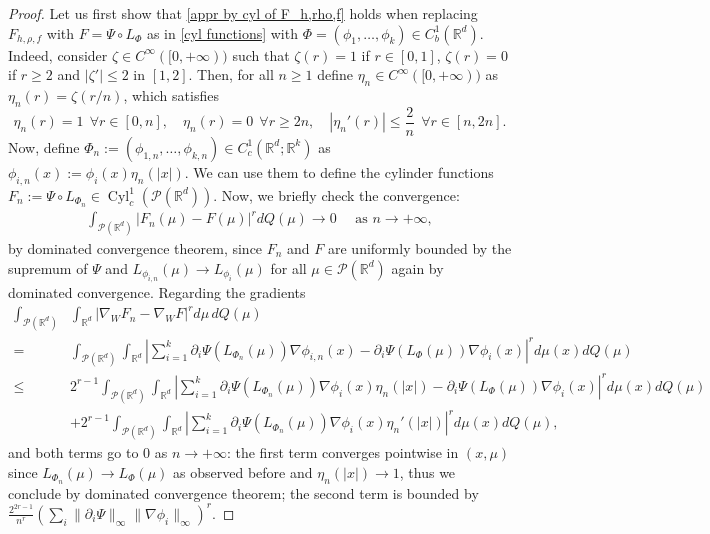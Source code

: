 \documentclass[10pt,leqno]{amsart}
\numberwithin{equation}{section}
\newcommand{\R}{\mathbb{R}}
\newcommand{\PP}{\mathcal{P}}
\begin{document}
\begin{proof}
	Let us first show that \eqref{appr by cyl of F_h,rho,f} holds when replacing $F_{h,\rho,f}$ with $F = \Psi \circ L_{\Phi}$ as in \eqref{cyl functions} with $\Phi = (\phi_1,\dots,\phi_k) \in C_b^1(\R^d)$. Indeed, consider $\zeta\in C^\infty([0,+\infty))$ such that $\zeta(r) = 1$ if $r\in[0,1]$, $\zeta(r) =0$ if $r\geq 2$ and $|\zeta'|\leq 2$ in $[1,2]$. Then, for all $n\geq 1$ define $\eta_n\in C^\infty([0,+\infty))$ as $\eta_n(r) = \zeta(r/n)$, which satisfies
	\[\eta_n(r)= 1\ \ \forall r\in[0,n], \quad \eta_n(r) = 0\ \ \forall r\geq 2n, \quad |\eta_n'(r)|\leq \frac{2}{n} \ \ \forall r\in[n,2n].\]
	Now, define $\Phi_n:= (\phi_{1,n}, \dots, \phi_{k,n}) \in C_c^1(\R^d;\R^k)$ as $\phi_{i,n}(x) := \phi_i(x) \eta_n(|x|)$. We can use them to define the cylinder functions $F_n := \Psi \circ L_{\Phi_n}\in\operatorname{Cyl}_c^1(\PP(\R^d))$. Now, we briefly check the convergence:
	\begin{align*}
		\int_{\PP(\R^d)} |F_n(\mu) - F(\mu)|^r dQ(\mu) \to 0 \quad \text{ as }n\to+\infty,
	\end{align*}
	by dominated convergence theorem, since $F_n$ and $F$ are uniformly bounded by the supremum of $\Psi$ and $L_{\phi_{i,n}}(\mu) \to L_{\phi_i}(\mu)$ for all $\mu\in \PP(\R^d)$ again by dominated convergence. Regarding the gradients
	\begin{align*}
		\int_{\PP(\R^d)} & \int_{\R^d} |\nabla_W F_n - \nabla_W F|^r d\mu \, dQ(\mu) 
		\\
		= & \int_{\PP(\R^d)} \int_{\R^d} \left| \sum_{i=1}^k \partial_i\Psi(L_{\Phi_{n}}(\mu)) \nabla\phi_{i,n}(x) - \partial_i\Psi(L_{\Phi}(\mu)) \nabla\phi_{i}(x) \right|^r d\mu(x) dQ(\mu)
		\\
		\leq & 2^{r-1} \int_{\PP(\R^d)} \int_{\R^d} \left| \sum_{i=1}^k \partial_i\Psi(L_{\Phi_{n}}(\mu))  \nabla\phi_{i}(x)\eta_n(|x|) - \partial_i\Psi(L_{\Phi}(\mu)) \nabla\phi_{i}(x) \right|^r d\mu(x) dQ(\mu)\\
		& + 2^{r-1} \int_{\PP(\R^d)} \int_{\R^d} \left| \sum_{i=1}^k \partial_i\Psi(L_{\Phi_{n}}(\mu))  \nabla \phi_i(x) \eta_n'(|x|) \right|^r d\mu(x) dQ(\mu),
	\end{align*}
	and both terms go to $0$ as $n\to +\infty$: the first term converges pointwise in $(x,\mu)$ since $L_{\Phi_n}(\mu) \to L_{\Phi}(\mu)$ as observed before and $\eta_n(|x|) \to 1$, thus we conclude by dominated convergence theorem; the second term is bounded by $\frac{2^{2r-1}}{n^r}  (\sum_{i} \|\partial_i \Psi\|_\infty \|\nabla \phi_i\|_\infty)^r $.


\end{proof}
\end{document}
